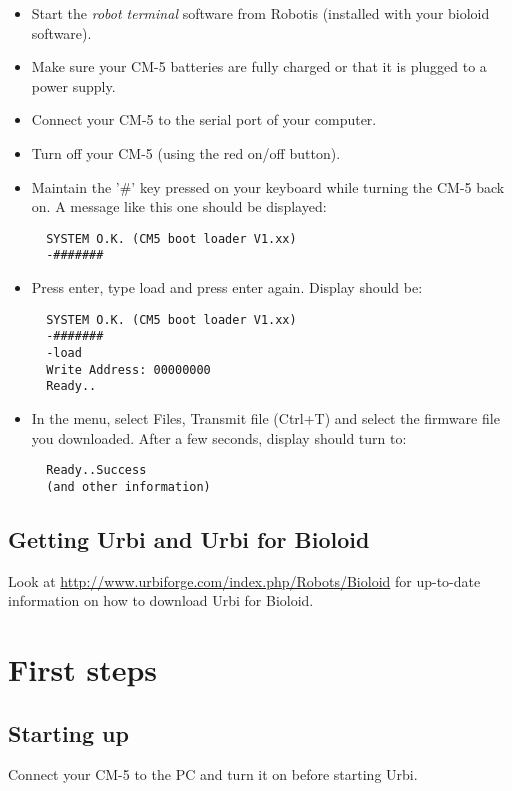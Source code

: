 \begin{itemize}
\item Start the {\em robot terminal} software from Robotis (installed with your
bioloid software).
\item Make sure your CM-5 batteries are fully charged or that it is plugged to a
power supply.
\item Connect your CM-5 to the serial port of your computer.
\item Turn off your CM-5 (using the red on/off button).
\item Maintain the '\#' key pressed on your keyboard while turning the CM-5 back
on. A message like this one should be displayed:

\begin{verbatim}
  SYSTEM O.K. (CM5 boot loader V1.xx)
  -#######
\end{verbatim}

\item Press enter, type load and press enter again. Display should be:
\begin{verbatim}
  SYSTEM O.K. (CM5 boot loader V1.xx)
  -#######
  -load
  Write Address: 00000000
  Ready..
\end{verbatim}

\item In the menu, select Files, Transmit file (Ctrl+T) and select the firmware
file you downloaded. After a few seconds, display should turn to:
\begin{verbatim}
  Ready..Success
  (and other information)
\end{verbatim}
\end{itemize}

\subsection{Getting Urbi and Urbi for Bioloid}

Look at \url{http://www.urbiforge.com/index.php/Robots/Bioloid} for up-to-date
information on how to download Urbi for Bioloid.

\section{First steps}

\subsection{Starting up}
Connect your CM-5 to the PC and turn it on before starting Urbi.

